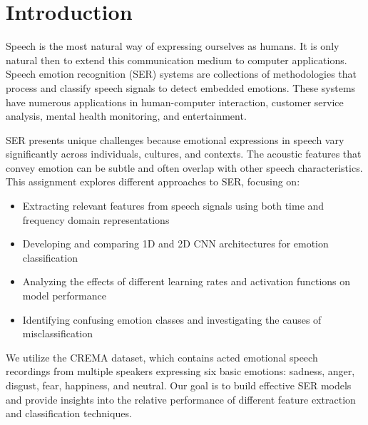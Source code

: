 \section{Introduction}

Speech is the most natural way of expressing ourselves as humans. It is only natural then to extend this communication medium to computer applications. Speech emotion recognition (SER) systems are collections of methodologies that process and classify speech signals to detect embedded emotions. These systems have numerous applications in human-computer interaction, customer service analysis, mental health monitoring, and entertainment.

SER presents unique challenges because emotional expressions in speech vary significantly across individuals, cultures, and contexts. The acoustic features that convey emotion can be subtle and often overlap with other speech characteristics. This assignment explores different approaches to SER, focusing on:

\begin{itemize}
    \item Extracting relevant features from speech signals using both time and frequency domain representations
    \item Developing and comparing 1D and 2D CNN architectures for emotion classification
    \item Analyzing the effects of different learning rates and activation functions on model performance
    \item Identifying confusing emotion classes and investigating the causes of misclassification
\end{itemize}

We utilize the CREMA dataset, which contains acted emotional speech recordings from multiple speakers expressing six basic emotions: sadness, anger, disgust, fear, happiness, and neutral. Our goal is to build effective SER models and provide insights into the relative performance of different feature extraction and classification techniques. 